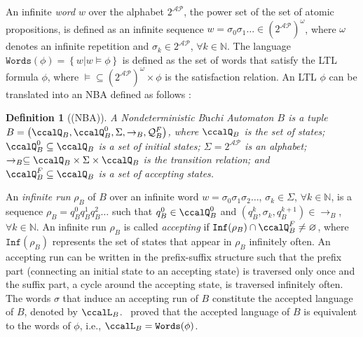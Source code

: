 \documentclass[Afour,sageh,times]{sagej}
\newtheorem{defn}[thm]{Definition}
\begin{document}
An infinite \textit{word} $w$ over the alphabet $2^{\mathcal{AP}}$, the power set of the set of atomic propositions, is defined as an infinite sequence  $w=\sigma_0\sigma_1\ldots\in (2^{\mathcal{AP}})^{\omega}$, where $\omega$ denotes an infinite repetition and $\sigma_k\in2^{\mathcal{AP}}$, $\forall k\in\mathbb{N}$. The language $\texttt{Words}(\phi)=\left\{w|w\models\phi\right\}$ is defined as the set of words that satisfy the LTL formula $\phi$, where $\models\subseteq (2^{\mathcal{AP}})^{\omega}\times\phi$ is the satisfaction relation. An LTL $\phi$ can be translated into an NBA  defined as follows \citep{vardi1986automata}:
\begin{defn}[(NBA)]\label{def:nba}
  A \textit{Nondeterministic B$\ddot{\text{u}}$chi Automaton} $B$ is  a tuple $B=\left(\ccalQ_{B}, \ccalQ_{B}^0,\Sigma,\rightarrow_B,\mathcal{Q}_B^F\right)$, where $\ccalQ_{B}$ is the set of states; $\ccalQ_{B}^0\subseteq\ccalQ_{B}$ is a set of initial states; $\Sigma=2^{\mathcal{AP}}$ is an alphabet;  $\rightarrow_{B}\subseteq\ccalQ_{B}\times \Sigma\times\ccalQ_{B}$ is the transition relation;
and $\ccalQ_B^F\subseteq\ccalQ_{B}$ is a set of accepting states.
\end{defn}


An \textit{infinite run} $\rho_B$ of $B$ over an infinite word $w=\sigma_0\sigma_1\sigma_2\dots$, $\sigma_k\in\Sigma$, $\forall k\in\mathbb{N}$, is a sequence $\rho_B=q_B^0q_B^1q_B^2\dots$ such that $q_B^0\in\ccalQ_B^0$ and $(q_B^{k},\sigma_k,q_B^{k+1})\in\rightarrow_{B}$, $\forall k\in\mathbb{N}$.
An infinite run $\rho_B$ is called \textit{accepting} if $\texttt{Inf}(\rho_B)\cap\ccalQ_B^F\neq\varnothing$, where $\texttt{Inf}(\rho_B)$ represents the set of states that appear in $\rho_B$ infinitely often. An accepting run can be written in the prefix-suffix structure such that the prefix part (connecting an initial state to an  accepting state) is traversed only once and the suffix part, a cycle around the accepting state, is traversed infinitely often.
The words $\sigma$ that induce an accepting run of $B$ constitute the accepted language of $B$, denoted by $\ccalL_B$.~\cite{baier2008principles} proved that the accepted language of $B$ is equivalent to the words of $\phi$, i.e., $\ccalL_B=\texttt{Words}(\phi)$.
\end{document}

